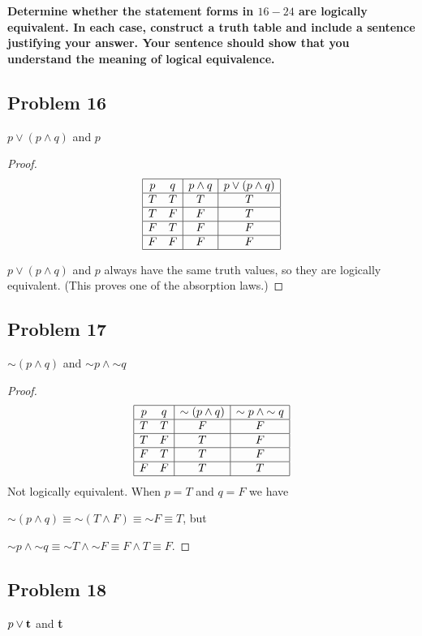 \documentclass[14pt]{extarticle}
\newcommand{\true}{{\bf t}}
\begin{document}
{\bf Determine whether the statement forms in $16-24$ are logically equivalent.
In each case, construct a truth table and include a sentence justifying your
answer. Your sentence should show that you understand the meaning of logical
equivalence.}

\subsection{Problem 16}
$p \vee (p \wedge q)$ and $p$

\begin{proof}
$$
\begin{array}{|cc|c|c|}
\hline
p & q & p \wedge q & p \vee (p \wedge q) \\
\hline
T & T & T & T \\
\hline
T & F & F & T \\
\hline
F & T & F & F \\
\hline
F & F & F & F \\
\hline
\end{array}
$$

$p \vee (p \wedge q)$ and $p$ always have the same truth values, so they are
logically equivalent. (This proves one of the absorption laws.)
\end{proof}

\subsection{Problem 17}
${\sim(p \wedge q)}$ and ${\sim p} \wedge {\sim q}$

\begin{proof}
$$
\begin{array}{|cc|c|c|}
\hline
p & q & {\sim(p \wedge q)} & {\sim p} \wedge {\sim q} \\
\hline
T & T & F & F \\
\hline
T & F & T & F \\
\hline
F & T & T & F \\
\hline
F & F & T & T \\
\hline
\end{array}
$$
Not logically equivalent. When $p = T$ and $q = F$ we have

${\sim (p \wedge q)} \equiv {\sim (T \wedge F)} \equiv {\sim F} \equiv T$, but

${\sim p} \wedge {\sim q} \equiv {\sim T \wedge {\sim F}} \equiv
F \wedge T \equiv F$.
\end{proof}

\subsection{Problem 18}
$p \vee \true$ and \true
\end{document}
